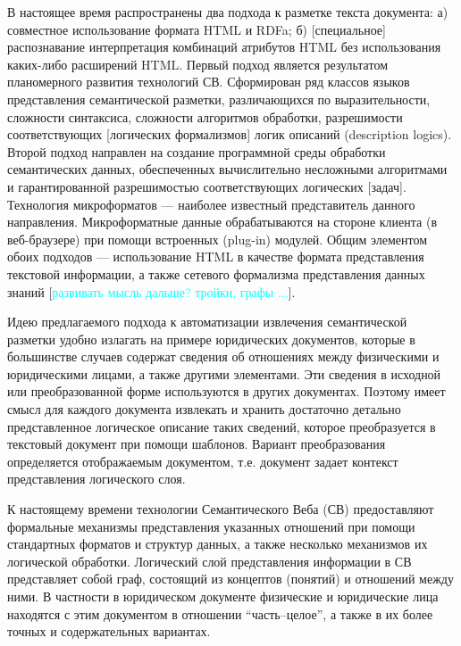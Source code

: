 \documentclass[utf8]{../IncArticle}
\newcommand{\e}[2][fcolor]{\textcolor{pcolor}{[}\textcolor{#1}{#2}\textcolor{pcolor}{]}}
\begin{document}
В настоящее время распространены два подхода к разметке текста
документа: а) совместное использование формата HTML и RDFa; б)
\e{специальное} распознавание интерпретация комбинаций атрибутов HTML
без использования каких-либо расширений HTML.  Первый подход является
результатом планомерного развития технологий СВ.  Сформирован ряд
классов языков представления семантической
разметки, различающихся по выразительности, сложности синтаксиса,
сложности алгоритмов обработки, разрешимости соответствующих
\e{логических формализмов} логик описаний (description logics).
Второй подход направлен на создание программной среды обработки
семантических данных, обеспеченных вычислительно несложными
алгоритмами и гарантированной разрешимостью соответствующих логических
\e{задач}.  Технология микроформатов \cite{b2:2} --- наиболее
известный представитель данного направления.  Микроформатные данные
обрабатываются на стороне клиента (в веб-браузере) при помощи
встроенных (plug-in) модулей.  Общим элементом обоих подходов ---
использование HTML в качестве формата представления текстовой
информации, а также сетевого формализма представления данных знаний
\e[cyan]{развивать мысль дальше? тройки, графы ...}.

Идею предлагаемого подхода к автоматизации извлечения семантической
разметки удобно излагать на примере юридических документов, которые в
большинстве случаев содержат сведения об отношениях между физическими
и юридическими лицами, а также другими элементами.  Эти сведения в
исходной или преобразованной форме используются в других документах.
Поэтому имеет смысл для каждого документа извлекать и хранить
достаточно детально представленное логическое описание таких сведений,
которое преобразуется в текстовый документ при помощи шаблонов.
Вариант преобразования определяется отображаемым документом,
т.е. документ задает контекст представления логического слоя.

К настоящему времени технологии Семантического Веба (СВ) предоставляют
формальные механизмы представления указанных отношений при помощи
стандартных форматов и структур данных, а также несколько механизмов
их логической обработки.  Логический слой представления информации в СВ
представляет собой граф, состоящий из концептов (понятий) и отношений
между ними.  В частности в юридическом документе физические и
юридические лица находятся с этим документом в отношении
``часть--целое'', а также в их более точных и содержательных вариантах.
\end{document}
